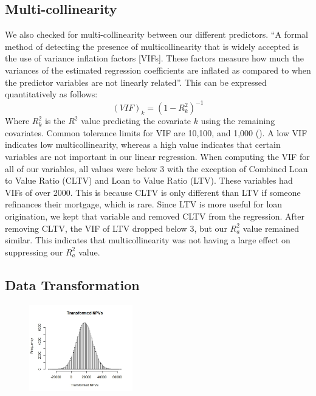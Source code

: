 \documentclass[12 pt]{uncw_thesis}
\theoremstyle{plain}
\theoremstyle{remark}
\theoremstyle{definition}
\begin{document}
\subsection{Multi-collinearity}
We also checked for multi-collinearity between our different predictors. ``A formal method of detecting the presence of multicollinearity that is widely accepted is the use of variance inflation factors [VIFs]. These factors measure how much the variances of the estimated regression coefficients are inflated as compared to when the predictor variables are not linearly related''\cite{512}. This can be expressed quantitatively as follows: 
\[(VIF)_k = (1-R_k^2)^{-1}\]
Where $R_k^2$ is the $R^2$ value predicting the covariate $k$ using the remaining covariates. Common tolerance limits for VIF are 10,100, and 1,000 (\cite[p.~408-410]{512}). A low VIF indicates low multicollinearity, whereas a high value indicates that certain variables are not important in our linear regression. 
When computing the VIF for all of our variables, all values were below 3 with the exception of Combined Loan to Value Ratio (CLTV) and Loan to Value Ratio (LTV). These variables had VIFs of over 2000. This is because CLTV is only different than LTV if someone refinances their mortgage, which is rare. Since LTV is more useful for loan origination, we kept that variable and removed CLTV from the regression. After removing CLTV, the VIF of LTV dropped below 3, but our \(R^2_a\) value remained similar. This indicates that multicollinearity was not having a large effect on suppressing our \(R^2_a\) value.

\subsection{Data Transformation}
\begin{figure}
	\vspace{-2\normalbaselineskip}
	\centering
	\includegraphics[width=0.4\textwidth]{images/Transformed.jpeg}
	\vspace{-\normalbaselineskip}
\end{figure}
\end{document}
